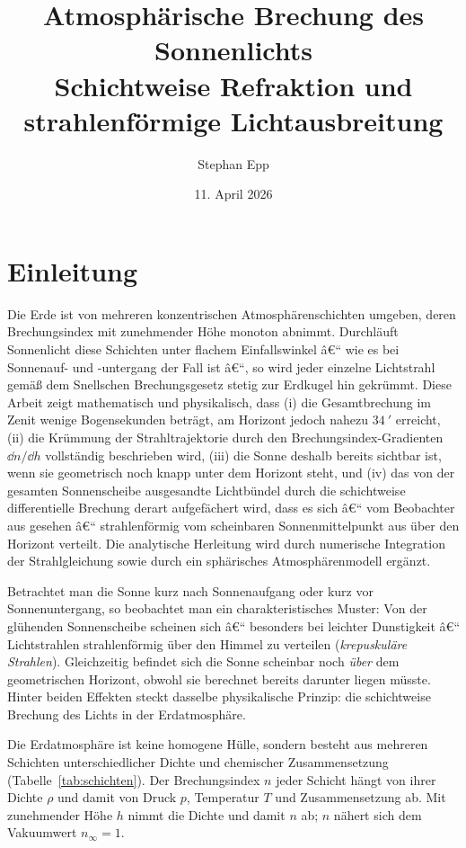 ﻿\documentclass[12pt,a4paper]{article}
\title{{\bfseries Atmosphärische Brechung des Sonnenlichts}\\ 
\Large Schichtweise Refraktion und strahlenförmige Lichtausbreitung}
\author{Stephan Epp}
\date{11. April 2026}
\begin{document}

\maketitle
\tableofcontents
\newpage

\section{Einleitung}
Die Erde ist von mehreren konzentrischen Atmosphärenschichten umgeben,
deren Brechungsindex mit zunehmender Höhe monoton abnimmt.
Durchläuft Sonnenlicht diese Schichten unter flachem Einfallswinkel â€“
wie es bei Sonnenauf- und -untergang der Fall ist â€“,
so wird jeder einzelne Lichtstrahl gemäß dem Snellschen Brechungsgesetz
stetig zur Erdkugel hin gekrümmt.
Diese Arbeit zeigt mathematisch und physikalisch,
dass (i) die Gesamtbrechung im Zenit wenige Bogensekunden beträgt,
am Horizont jedoch nahezu $\SI{34}{\arcminute}$ erreicht,
(ii) die Krümmung der Strahltrajektorie durch den Brechungsindex-Gradienten
$\dd n/\dd h$ vollständig beschrieben wird,
(iii) die Sonne deshalb bereits sichtbar ist, wenn sie geometrisch
noch knapp unter dem Horizont steht, und
(iv) das von der gesamten Sonnenscheibe ausgesandte Lichtbündel
durch die schichtweise differentielle Brechung derart aufgefächert wird,
dass es sich â€“ vom Beobachter aus gesehen â€“ strahlenförmig
vom scheinbaren Sonnenmittelpunkt aus über den Horizont verteilt.
Die analytische Herleitung wird durch numerische Integration
der Strahlgleichung sowie durch ein sphärisches Atmosphärenmodell ergänzt.

Betrachtet man die Sonne kurz nach Sonnenaufgang oder kurz vor
Sonnenuntergang,
so beobachtet man ein charakteristisches Muster:
Von der glühenden Sonnenscheibe scheinen sich â€“ besonders bei
leichter Dunstigkeit â€“ Lichtstrahlen strahlenförmig über den
Himmel zu verteilen (\emph{krepuskuläre Strahlen}).
Gleichzeitig befindet sich die Sonne scheinbar noch \emph{über} dem
geometrischen Horizont, obwohl sie berechnet bereits darunter
liegen müsste.
Hinter beiden Effekten steckt dasselbe physikalische Prinzip:
die schichtweise Brechung des Lichts in der Erdatmosphäre.

Die Erdatmosphäre ist keine homogene Hülle, sondern besteht
aus mehreren Schichten unterschiedlicher Dichte und chemischer
Zusammensetzung (Tabelle~\ref{tab:schichten}).
Der Brechungsindex $n$ jeder Schicht hängt von ihrer Dichte $\rho$
und damit von Druck $p$, Temperatur $T$ und Zusammensetzung ab.
Mit zunehmender Höhe $h$ nimmt die Dichte und damit $n$ ab;
$n$ nähert sich dem Vakuumwert $n_{\infty} = 1$.
\end{document}
